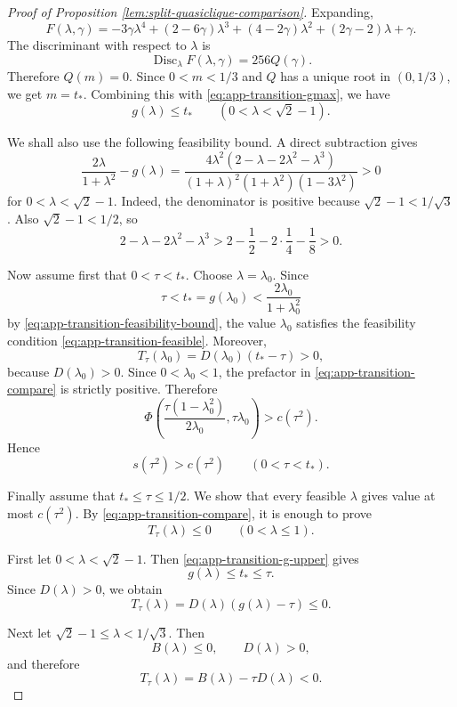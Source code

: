 \documentclass[10pt,a4paper]{amsart}
\begin{document}
\begin{proof}[Proof of Proposition \ref{lem:split-quasiclique-comparison}]
Expanding,
\[
F(\lambda,\gamma)
=
-3\gamma\lambda^4
+(2-6\gamma)\lambda^3
+(4-2\gamma)\lambda^2
+(2\gamma-2)\lambda
+\gamma .
\]
The discriminant with respect to \(\lambda\) is
\[
\operatorname{Disc}_\lambda F(\lambda,\gamma)
=
256Q(\gamma).
\]
Therefore $Q(m)=0$.
Since \(0<m<1/3\) and \(Q\) has a unique root in \((0,1/3)\), we get
$m=t_*$.
Combining this with \eqref{eq:app-transition-gmax}, we have
\begin{equation}\label{eq:app-transition-g-upper}
g(\lambda)\le t_*
\qquad
(0<\lambda<\sqrt{2}-1).
\end{equation}


We shall also use the following feasibility bound. A direct subtraction gives
\begin{equation}\label{eq:app-transition-feasibility-bound}
\frac{2\lambda}{1+\lambda^2}-g(\lambda)
=
\frac{4\lambda^2(2-\lambda-2\lambda^2-\lambda^3)}
{(1+\lambda)^2(1+\lambda^2)(1-3\lambda^2)}
>0
\end{equation}
for \(0<\lambda<\sqrt{2}-1\). Indeed, the denominator is positive because
\(\sqrt{2}-1<1/\sqrt{3}\). Also \(\sqrt{2}-1<1/2\), so
\[
2-\lambda-2\lambda^2-\lambda^3
>
2-\frac12-2\cdot\frac14-\frac18>0.
\]


Now assume first that \(0<\tau<t_*\). Choose \(\lambda=\lambda_0\). Since
\[
\tau<t_*=g(\lambda_0)
<
\frac{2\lambda_0}{1+\lambda_0^2}
\]
by \eqref{eq:app-transition-feasibility-bound}, the value \(\lambda_0\)
satisfies the feasibility condition \eqref{eq:app-transition-feasible}.
Moreover,
\[
T_\tau(\lambda_0)
=
D(\lambda_0)(t_*-\tau)>0,
\]
because \(D(\lambda_0)>0\). Since \(0<\lambda_0<1\), the prefactor in
\eqref{eq:app-transition-compare} is strictly positive. Therefore
\[
\Phi\left(\frac{\tau(1-\lambda_0^2)}{2\lambda_0},\tau\lambda_0\right)
>
c(\tau^2).
\]
Hence
\[
s(\tau^2)>c(\tau^2)
\qquad
(0<\tau<t_*).
\]


Finally assume that \(t_*\le\tau\le1/2\). We show that every feasible
\(\lambda\) gives value at most \(c(\tau^2)\). By
\eqref{eq:app-transition-compare}, it is enough to prove
\[
T_\tau(\lambda)\le0
\qquad
(0<\lambda\le1).
\]


First let \(0<\lambda<\sqrt{2}-1\). Then
\eqref{eq:app-transition-g-upper} gives
\[
g(\lambda)\le t_*\le\tau.
\]
Since \(D(\lambda)>0\), we obtain
\[
T_\tau(\lambda)
=
D(\lambda)(g(\lambda)-\tau)\le0.
\]


Next let \(\sqrt{2}-1\le\lambda<1/\sqrt{3}\). Then
\[
B(\lambda)\le0,
\qquad
D(\lambda)>0,
\]
and therefore
\[
T_\tau(\lambda)=B(\lambda)-\tau D(\lambda)<0.
\]



\end{proof}
\end{document}
